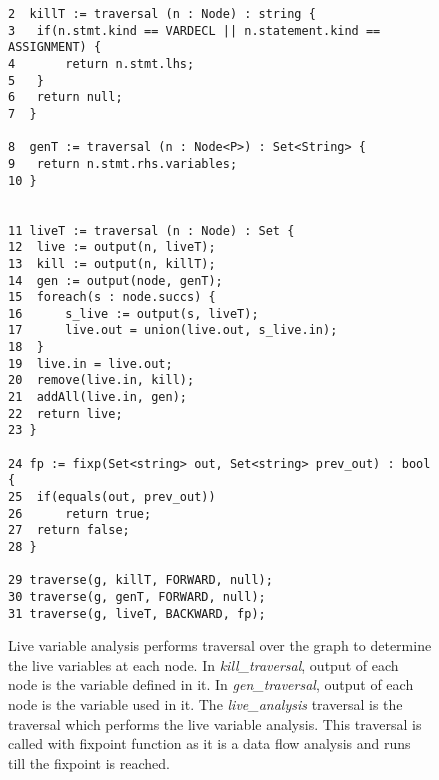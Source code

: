 \begin{figure}[ht!]
\centering
\begin{lstlisting}
2  killT := traversal (n : Node) : string { 
3  	if(n.stmt.kind == VARDECL || n.statement.kind == ASSIGNMENT) { 
4		return n.stmt.lhs; 
5	} 
6	return null; 
7  } 

8  genT := traversal (n : Node<P>) : Set<String> { 
9	return n.stmt.rhs.variables; 
10 } 


11 liveT := traversal (n : Node) : Set { 
12	live := output(n, liveT); 
13	kill := output(n, killT); 
14	gen := output(node, genT);  
15	foreach(s : node.succs) {
16		s_live := output(s, liveT);
17		live.out = union(live.out, s_live.in); 
18	}
19	live.in = live.out; 
20	remove(live.in, kill); 
21	addAll(live.in, gen); 
22	return live; 
23 }

24 fp := fixp(Set<string> out, Set<string> prev_out) : bool {
25	if(equals(out, prev_out))
26		return true;
27	return false;
28 }

29 traverse(g, killT, FORWARD, null);
30 traverse(g, genT, FORWARD, null); 
31 traverse(g, liveT, BACKWARD, fp); 				
\end{lstlisting}
\caption{Live variable analysis performs traversal over the graph to determine the live variables at each node. In \textit{kill\_traversal}, output of each node is the variable defined in it. In \textit{gen\_traversal}, output of each node is the variable used in it. The \textit{live\_analysis} traversal is the traversal which performs the live variable analysis. This traversal is called with fixpoint function as it is a data flow analysis and runs till the fixpoint is reached.}
\label{fig:live-variable}
\end{figure}
